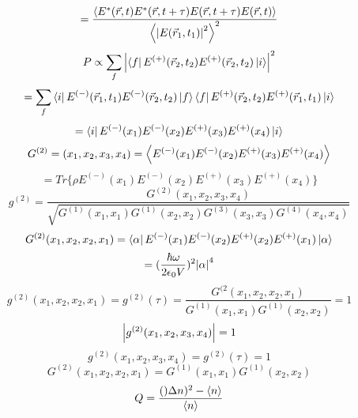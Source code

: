 \documentclass[9pt]{article}
\begin{document}
\begin{equation*}
    =\frac{\ev{E^*(\vec{r},t)E^*(\vec{r},t+\tau)E(\vec{r},t+\tau)E(\vec{r},t)}}{\ev{\abs{E(\vec{r}_1,t_1)}^2}^2}
\end{equation*}
\begin{equation}
    P\propto\sum_f\abs{\bra{f}E^{(+)}(\vec{r}_2,t_2)E^{(+)}(\vec{r}_2,t_2)\ket{i}}^2
\end{equation}
\begin{equation*}
    =\sum_f\bra{i}E^{(-)}(\vec{r}_1,t_1)E^{(-)}(\vec{r}_2,t_2)\ket{f}\bra{f}E^{(+)}(\vec{r}_2,t_2)E^{(+)}(\vec{r}_1,t_1)\ket{i}
\end{equation*}
\begin{equation*}
    =\bra{i}E^{(-)}(x_1)E^{(-)}(x_2)E^{(+)}(x_3)E^{(+)}(x_4)\ket{i}
\end{equation*}
\begin{equation}
    G^{(2)}=(x_1,x_2,x_3,x_4)=\ev{E^{(-)}(x_1)E^{(-)}(x_2)E^{(+)}(x_3)E^{(+)}(x_4)}
\end{equation}
\begin{equation*}
    =Tr\{\rho E^{(-)}(x_1)E^{(-)}(x_2)E^{(+)}(x_3)E^{(+)}(x_4)\}
\end{equation*}
\begin{equation}
    g^{(2)}=\frac{G^{(2)}(x_1,x_2,x_3,x_4)}{\sqrt{G^{(1)}(x_1,x_1)G^{(1)}(x_2,x_2)G^{(3)}(x_3,x_3)G^{(4)}(x_4,x_4)}}
\end{equation}
\begin{equation}
    G^{(2)}(x_1,x_2,x_2,x_1)=\bra{\alpha}E^{(-)}(x_1)E^{(-)}(x_2)E^{(+)}(x_2)E^{(+)}(x_1)\ket{\alpha}
\end{equation}
\begin{equation*}
    =(\frac{\hbar \omega }{2\epsilon_0 V })^2 \abs{\alpha}^4
\end{equation*}
\begin{equation}
    g^{(2)}(x_1,x_2,x_2,x_1)=g^{(2)}(\tau)=\frac{G^{(2}(x_1,x_2,x_2,x_1)}{G^{(1)}(x_1,x_1)G^{(1)}(x_2,x_2)} = 1
\end{equation}
\begin{equation}
    \abs{g^{(2)}(x_1,x_2,x_3,x_4)}=1
\end{equation}
\begin{equation}
    g^{(2)}(x_1,x_2,x_3,x_4)=g^{(2)}(\tau)=1
\end{equation}
\begin{equation}
    G^{(2)}(x_1,x_2,x_2,x_1)=G^{(1)}(x_1,x_1)G^{(1)}(x_2,x_2)
\end{equation}
\begin{equation}
    Q=\frac{()\Delta n)^2-\ev{n}}{\ev{n}}
\end{equation}
\end{document}

